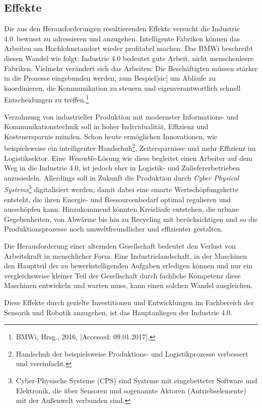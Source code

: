 \subsection{Effekte}\label{ssec:i40Effects}
Die aus den Herausforderungen resultierenden Effekte versucht die \frqq Industrie 4.0\flqq\ bewusst zu adressieren und anzugehen.
Intelligente Fabriken können das Arbeiten am Hochlohnstandort wieder profitabel machen. Das BMWi beschreibt diesen Wandel wie folgt: \glqq Industrie 4.0 bedeutet gute Arbeit, nicht menschenleere Fabriken. Vielmehr verändert sich das Arbeiten: Die Beschäftigten müssen stärker in die Prozesse eingebunden werden, zum Bespiel[sic] um Abläufe zu koordinieren, die Kommunikation zu steuern und eigenverantwortlich schnell Entscheidungen zu treffen\grqq.\footnote{ BMWi, Hrsg., 2016, [Accessed: 09.01.2017].}

Verzahnung von industrieller Produktion mit modernster Informations- und Kommunikationstechnik soll in hoher Individualität, Effizienz und Kostenersparnis münden. Schon heute ermöglichen Innovationen, wie beispielsweise ein intelligenter Handschuh\footnote{ Handschuh der beispielsweise Produktions- und Logistikprozesse verbessert und vereinfacht.}, Zeitersparnisse und mehr Effizienz im Logistiksektor. Eine \textit{Wearable}-Lösung wie diese begleitet einen Arbeiter auf dem Weg in die \frqq Industrie 4.0\flqq, ist jedoch eher in Logistik- und Zuliefererbetrieben anzusiedeln. Allerdings soll in Zukunft die Produktion durch \textit{Cyber Physical Systems}\footnote{ Cyber-Physische Systeme (CPS) sind Systeme mit eingebetteter Software und Elektronik, die über Sensoren und sogenannte Aktoren (Antriebselemente) mit der Außenwelt verbunden sind.} digitalisiert werden, damit dabei eine smarte Wertschöpfungskette entsteht, die ihren Energie- und Ressourcenbedarf optimal regulieren und ausschöpfen kann. Hinzukommend könnten Kreisläufe entstehen, die urbane Gegebenheiten, von Abwärme bis hin zu Recycling mit berücksichtigen und so die Produktionsprozesse noch umweltfreundlicher und effizienter gestalten.

Die Herausforderung einer alternden Gesellschaft bedeutet den Verlust von Arbeitskraft in menschlicher Form. Eine Industrielandschaft, in der Maschinen den Hauptteil der zu bewerkstelligenden Aufgaben erledigen können und nur ein vergleichsweise kleiner Teil der Gesellschaft durch fachliche Kompetenz diese Maschinen entwickeln und warten muss, kann einen solchen Wandel ausgleichen.

Diese Effekte durch gezielte Investitionen und Entwicklungen im Fachbereich der Sensorik und Robotik anzugehen, ist das Hauptanliegen der \frqq Industrie 4.0\flqq.\newpage
